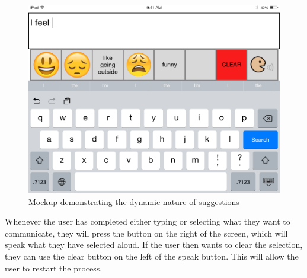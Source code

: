 \begin{figure}[htb]
\centering
\includegraphics[width=\textwidth]{iPadLandscapeDynamic.png}
\caption{Mockup demonstrating the dynamic nature of suggestions}
\label{fig:uiDynamic}
\end{figure}

Whenever the user has completed either typing or selecting what they want to communicate, they will press the button on the right of the screen, which will speak what they have selected aloud. If the user then wants to clear the selection, they can use the clear button on the left of the speak button. This will allow the user to restart the process.

